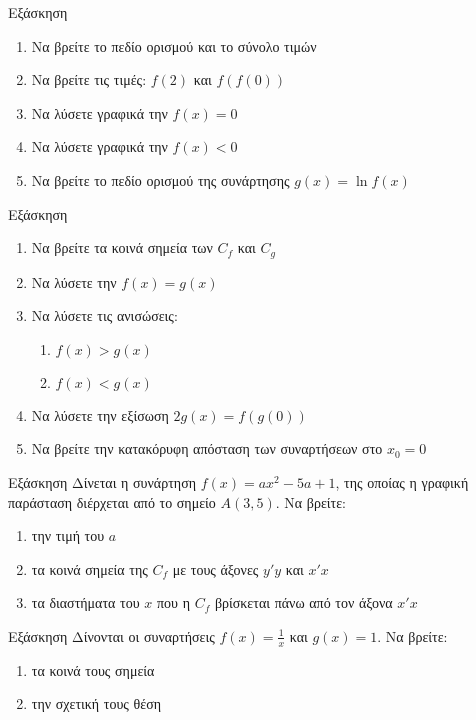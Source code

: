 \documentclass[greek]{beamer}
\begin{document}
\begin{frame}{Εξάσκηση}
 \href{https://www.geogebra.org/m/jmmx7bp8}{}
 \begin{enumerate}
  \item<1-> Να βρείτε το πεδίο ορισμού και το σύνολο τιμών
  \item Να βρείτε τις τιμές: $f(2)$ και $f(f(0))$
  \item<2-> Να λύσετε γραφικά την $f(x)=0$
  \item<3-> Να λύσετε γραφικά την $f(x)<0$
  \item<4-> Να βρείτε το πεδίο ορισμού της συνάρτησης $g(x)=\ln f(x)$
 \end{enumerate}
\end{frame}

\begin{frame}{Εξάσκηση}
 \href{https://www.geogebra.org/m/td6m58hw}{}
 \begin{enumerate}
  \item<1-> Να βρείτε τα κοινά σημεία των $C_f$ και $C_g$
  \item<2-> Να λύσετε την $f(x)=g(x)$
  \item<3-> Να λύσετε τις ανισώσεις:
        \begin{enumerate}
         \item<4-> $f(x)>g(x)$
         \item<5-> $f(x)<g(x)$
        \end{enumerate}
  \item<6-> Να λύσετε την εξίσωση $2g(x)=f(g(0))$
  \item<7-> Να βρείτε την κατακόρυφη απόσταση των συναρτήσεων στο $x_0=0$
 \end{enumerate}
\end{frame}

\begin{frame}{Εξάσκηση}
 Δίνεται η συνάρτηση $f(x)=ax^2-5a+1$, της οποίας η γραφική παράσταση διέρχεται από το σημείο $Α(3,5)$. Να βρείτε:
 \begin{enumerate}
  \item<1-> την τιμή του $a$
  \item<2-> τα κοινά σημεία της $C_f$ με τους άξονες $y'y$ και $x'x$
  \item<3-> τα διαστήματα του $x$ που η $C_f$ βρίσκεται πάνω από τον άξονα $x'x$
 \end{enumerate}
\end{frame}

\begin{frame}{Εξάσκηση}
 Δίνονται οι συναρτήσεις $f(x)=\frac{1}{x}$ και $g(x)=1$. Να βρείτε:
 \begin{enumerate}
  \item<1-> τα κοινά τους σημεία
  \item<2-> την σχετική τους θέση
 \end{enumerate}
\end{frame}
\end{document}
